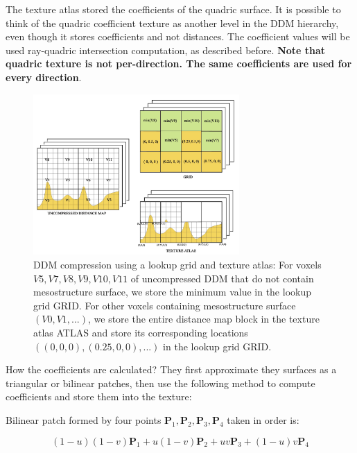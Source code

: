 The texture atlas stored the coefficients of the quadric surface. It is possible to think of the quadric coefficient texture as another level in the DDM hierarchy, even though it stores coefficients and not distances. The coefficient values will be used ray-quadric intersection computation, as described before. \textbf{Note that quadric texture is not per-direction. The same coefficients are used for every direction}.

\begin{figure}\label{f:ddm-compression}
	\begin{center}
		\includegraphics[width=0.7\textwidth]{graphics/df/ddm-compression}
	\end{center}
	\caption{DDM compression using a lookup grid and texture atlas: For voxels $V5, V7, V8, V9, V10, V11$ of uncompressed DDM that do not contain mesostructure surface, we store the minimum value in the lookup grid GRID. For other voxels containing mesostructure surface $(V0, V1, ...)$, we store the entire distance map block in the texture atlas ATLAS and store its corresponding locations $((0, 0, 0), (0.25, 0, 0), ...)$ in the lookup grid GRID.}
\end{figure}

How the coefficients are calculated? They first approximate they surfaces as a triangular or bilinear patches, then use the following method to compute coefficients and store them into the texture:

Bilinear patch formed by four points $\mathbf{P}_{1},\mathbf{P}_{2},\mathbf{P}_{3},\mathbf{P}_{4}$ taken in order is:

\begin{equation}
	(1-u)(1-v)\mathbf{P}_{1}+u(1-v)\mathbf{P}_{2}+uv\mathbf{P}_{3}+(1-u)v\mathbf{P}_{4}
\end{equation}

